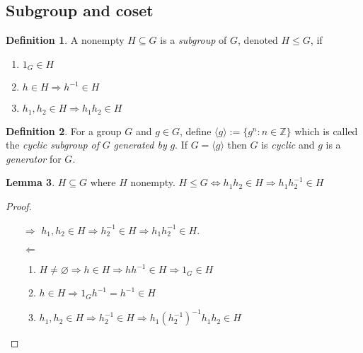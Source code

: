 \documentclass[a4paper]{article}
\theoremstyle{definition}
\newtheorem{defn}{Definition}[subsection]
\newtheorem{lemma}[defn]{Lemma}
\begin{document}
\subsection{Subgroup and coset}
\begin{defn}
A nonempty $H\subseteq G$ is a \textit{subgroup} of $G$, denoted $H\leq G$, if
\begin{enumerate}
\item $1_G\in H$
\item $h\in H\Rightarrow h^{-1}\in H$
\item $h_1,h_2\in H \Rightarrow h_1h_2\in H$
\end{enumerate}
\end{defn}
\begin{defn}
For a group $G$ and $g\in G$, define $\langle g\rangle:=\{g^n:n\in\mathbb Z\}$ which is called the \textit{cyclic subgroup of} $G$ \textit{generated by} $g$. If $G=\langle g\rangle$ then $G$ is \textit{cyclic} and $g$ is a \textit{generator} for $G$.
\end{defn}
\begin{lemma}
\label{lemma:sgptest}
$H\subseteq G$ where $H$ nonempty. $H\leq G \Leftrightarrow h_1h_2\in H\Rightarrow h_1h_2^{-1}\in H$
\end{lemma}
\begin{proof}
\begin{itemize}
\item[$\Rightarrow$] $h_1,h_2\in H\Rightarrow h_2^{-1}\in H\Rightarrow h_1h_2^{-1}\in H$.
\item[$\Leftarrow$] \begin{enumerate}
\item $H\neq \varnothing\Rightarrow h\in H\Rightarrow hh^{-1}\in H\Rightarrow 1_G\in H$
\item $h\in H\Rightarrow 1_Gh^{-1}=h^{-1}\in H$
\item $h_1,h_2\in H\Rightarrow h_2^{-1}\in H\Rightarrow h_1(h_2^{-1})^{-1}h_1h_2\in H$
\end{enumerate}
\end{itemize}
\end{proof}
\end{document}
